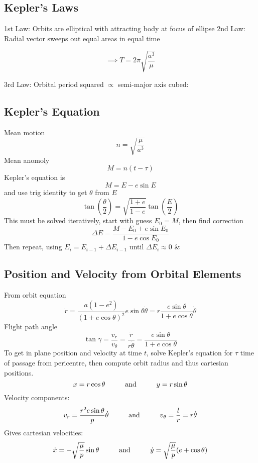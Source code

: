 \documentclass[table,cmyk]{article}
\begin{document}
\begin{longtable}
\subsection*{Kepler's Laws}
1st Law: Orbits are elliptical with attracting body at focus of ellipse
\newline
\newline
2nd Law: Radial vector sweeps out equal areas in equal time

\[\implies T = 2\pi\sqrt{\frac{a^3}{\mu}} \]

3rd Law: Orbital period squared $\propto$ semi-major axis cubed:
\subsection*{Kepler's Equation}
Mean motion
\[n=\sqrt{\frac{\mu}{a^3}}\]
Mean anomoly
\[M=n(t-\tau)\]
Kepler's equation is
\[M=E-e\sin E\]
and use trig identity to get $\theta$ from $E$
\[\tan \left(\frac{\theta}{2}\right) = \sqrt{\frac{1+e}{1-e}}\tan \left(\frac{E}{2}\right)\]
This must be solved iteratively, start with guess $E_0 = M$, then find correction
\[\Delta E = \frac{M-E_0+e\sin E_0}{1-e\cos E_0}\]
Then repeat, using $E_i = E_{i-1}+\Delta E_{i-1}$ until $\Delta E_i \approx 0$
&
\subsection*{Position and Velocity from Orbital Elements}
From orbit equation
\[\dot{r} = \frac{a(1-e^2)}{(1+e\cos \theta)^2} e\sin \theta \dot{\theta} = r\frac{e\sin \theta}{1+e\cos \theta} \dot{\theta}\]
Flight path angle
\[\tan \gamma = \frac{v_r}{v_\theta}=\frac{\dot{r}}{r\dot{\theta}}=\frac{e\sin \theta}{1+e \cos \theta}\]
To get in plane position and velocity at time $t$, solve Kepler's equation for $\tau$ time of passage from pericentre, then compute orbit radius and thus cartesian positions.
\[x = r\cos \theta \text{\hspace{1cm}and\hspace{1cm}} y = r\sin \theta\]
Velocity components:
\[v_r = \frac{r^2e\sin \theta}{p}\dot{\theta}\text{\hspace{1cm}and\hspace{1cm}}v_\theta = \frac{l}{r} = r\dot{\theta}\]
Gives cartesian velocities:
\[\dot{x} = -\sqrt{\frac{\mu}{p}}\sin \theta \text{\hspace{1cm}and\hspace{1cm}}\dot{y} = \sqrt{\frac{\mu}{p}}(e+\cos \theta)\]
\tabularnewline\hline
\end{longtable}
\end{document}
